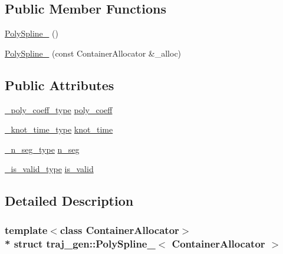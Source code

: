 \subsection*{Public Member Functions}
\begin{DoxyCompactItemize}
\item 
\hyperlink{structtraj__gen_1_1_poly_spline___aace33b70b9ef10bfc17096fb7f2ef851}{Poly\+Spline\+\_\+} ()
\item 
\hyperlink{structtraj__gen_1_1_poly_spline___a3d60c80d9701456812fc6cf3109fc0f1}{Poly\+Spline\+\_\+} (const Container\+Allocator \&\+\_\+alloc)
\end{DoxyCompactItemize}
\subsection*{Public Attributes}
\begin{DoxyCompactItemize}
\item 
\hyperlink{structtraj__gen_1_1_poly_spline___a023653ddcbaae9497c397e82ffd22217}{\+\_\+poly\+\_\+coeff\+\_\+type} \hyperlink{structtraj__gen_1_1_poly_spline___a0f2e8bfe261fae6f2b762c093c0d692d}{poly\+\_\+coeff}
\item 
\hyperlink{structtraj__gen_1_1_poly_spline___a7826607c170993b6a3846b1d9696c60e}{\+\_\+knot\+\_\+time\+\_\+type} \hyperlink{structtraj__gen_1_1_poly_spline___a244b6ee80a42fc29772de46dab1f259f}{knot\+\_\+time}
\item 
\hyperlink{structtraj__gen_1_1_poly_spline___af986120ad67cf19dd0405f94fca0f965}{\+\_\+n\+\_\+seg\+\_\+type} \hyperlink{structtraj__gen_1_1_poly_spline___aa7abf080efc8e19690ac95f3222b1f23}{n\+\_\+seg}
\item 
\hyperlink{structtraj__gen_1_1_poly_spline___a0176a14c07afec73c6cc8860ba90af3c}{\+\_\+is\+\_\+valid\+\_\+type} \hyperlink{structtraj__gen_1_1_poly_spline___a42cb433485a56a70d9da359939866749}{is\+\_\+valid}
\end{DoxyCompactItemize}


\subsection{Detailed Description}
\subsubsection*{template$<$class Container\+Allocator$>$\\*
struct traj\+\_\+gen\+::\+Poly\+Spline\+\_\+$<$ Container\+Allocator $>$}



